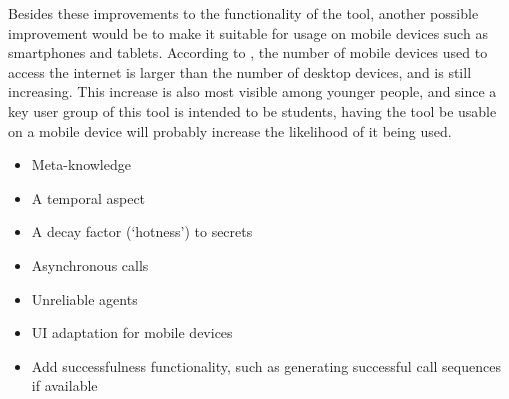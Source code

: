 Besides these improvements to the functionality of the tool, 
another possible improvement would be to make it suitable for usage on mobile devices such as smartphones and tablets.
According to \textcite{cisco_cisco_2020}, the number of mobile devices used to access the internet is larger than the number of desktop devices, and is still increasing.
This increase is also most visible among younger people,
and since a key user group of this tool is intended to be students,
having the tool be usable on a mobile device will probably increase the likelihood of it being used.

\begin{itemize}
    \item Meta-knowledge \parencite{herzig_how_2017}
    \item A temporal aspect \parencite[also includes meta-knowledge]{slavkovik_temporal_2019}
    \item A decay factor (`hotness') to secrets \parencite{demers_epidemic_1988}
    \item Asynchronous calls \addcite
    \item Unreliable agents \parencite{van_den_berg_unreliable_2018}
    \item UI adaptation for mobile devices \parencite{cisco_cisco_2020}
    \item Add successfulness functionality, such as generating successful call sequences if available
\end{itemize}
